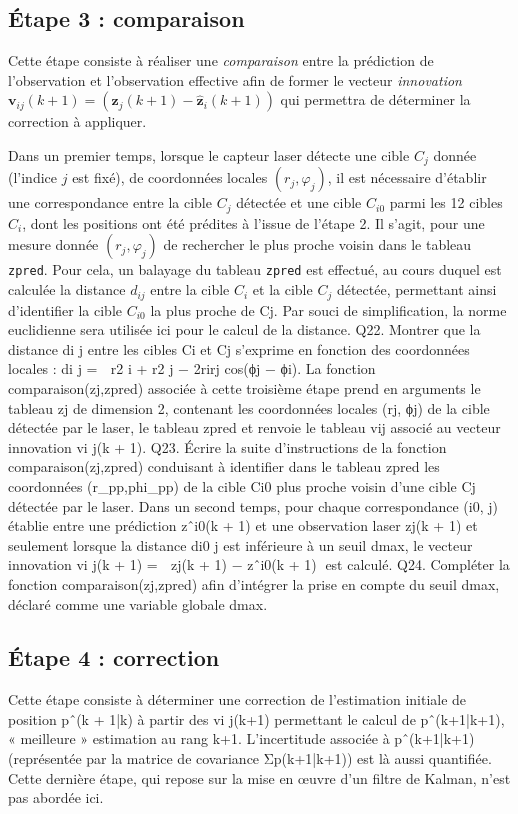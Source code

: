 \subsection*{Étape 3 : comparaison}

Cette étape consiste à réaliser une \textit{comparaison} entre la prédiction de l’observation et l’observation
effective afin de former le vecteur \textit{innovation} $\bm{v}_{ij}(k + 1) = \left(\bm{z}_{j}(k + 1) - \hat{\bm{z}}_{i}(k + 1)\right)$
qui permettra de
déterminer la correction à appliquer.

Dans un premier temps, lorsque le capteur laser détecte une cible $C_j$ donnée (l’indice $j$ est fixé), de
coordonnées locales $(r_j, \varphi_j)$, il est nécessaire d’établir une correspondance entre la cible $C_j$ détectée et
une cible $C_{i0}$ parmi les 12 cibles $C_i$, dont les positions ont été prédites à l’issue de l’étape 2. Il s’agit,
pour une mesure donnée $(r_j, \varphi_j)$ de rechercher le plus proche voisin dans le tableau \lstinline{zpred}. Pour cela,
un balayage du tableau \lstinline{zpred} est effectué, au cours duquel est calculée la distance $d_{i j}$ entre la cible
$C_i$ et la cible $C_j$ détectée, permettant ainsi d’identifier la cible $C_{i0}$ la plus proche de Cj. Par souci de
simplification, la norme euclidienne sera utilisée ici pour le calcul de la distance.
Q22. Montrer que la distance di j entre les cibles Ci et Cj s’exprime en fonction des coordonnées
locales :
di j =

r2
i + r2
j − 2rirj cos(ϕj − ϕi).
La fonction comparaison(zj,zpred) associée à cette troisième étape prend en arguments le tableau
zj de dimension 2, contenant les coordonnées locales (rj, ϕj) de la cible détectée par le laser, le tableau
zpred et renvoie le tableau vij associé au vecteur innovation vi j(k + 1).
Q23. Écrire la suite d’instructions de la fonction comparaison(zj,zpred) conduisant à identifier
dans le tableau zpred les coordonnées (r_pp,phi_pp) de la cible Ci0 plus proche voisin
d’une cible Cj détectée par le laser.
Dans un second temps, pour chaque correspondance (i0, j) établie entre une prédiction zˆi0(k + 1) et
une observation laser zj(k + 1) et seulement lorsque la distance di0 j est inférieure à un seuil dmax, le
vecteur innovation vi j(k + 1) =

zj(k + 1) − zˆi0(k + 1)
est calculé.
Q24. Compléter la fonction comparaison(zj,zpred) afin d’intégrer la prise en compte du seuil
dmax, déclaré comme une variable globale dmax.

\subsection*{Étape 4 : correction}

Cette étape consiste à déterminer une correction de l’estimation initiale de position pˆ(k + 1|k) à partir
des vi j(k+1) permettant le calcul de pˆ(k+1|k+1), « meilleure » estimation au rang k+1. L’incertitude
associée à pˆ(k+1|k+1) (représentée par la matrice de covariance Σp(k+1|k+1)) est là aussi quantifiée.
Cette dernière étape, qui repose sur la mise en œuvre d’un filtre de Kalman, n’est pas abordée ici.

